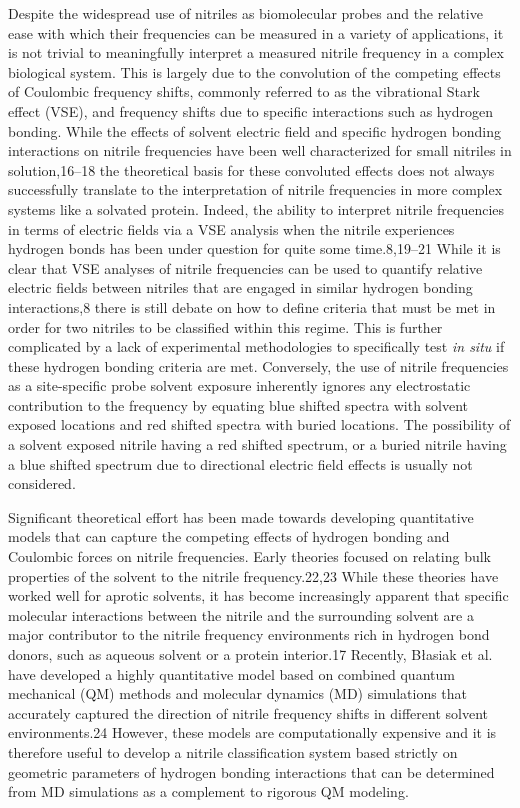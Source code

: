 Despite the widespread use of nitriles as biomolecular probes and the relative ease with which their frequencies can be measured in a variety of applications, it is not trivial to meaningfully interpret a measured nitrile frequency in a complex biological system.
This is largely due to the convolution of the competing effects of Coulombic frequency shifts, commonly referred to as the vibrational Stark effect (VSE), and frequency shifts due to specific interactions such as hydrogen bonding.
While the effects of solvent electric field and specific hydrogen bonding interactions on nitrile frequencies have been well characterized for small nitriles in solution,16–18 the theoretical basis for these convoluted effects does not always successfully translate to the interpretation of nitrile frequencies in more complex systems like a solvated protein.
Indeed, the ability to interpret nitrile frequencies in terms of electric fields via a VSE analysis when the nitrile experiences hydrogen bonds has been under question for quite some time.8,19–21
While it is clear that VSE analyses of nitrile frequencies can be used to quantify relative electric fields between nitriles that are engaged in similar hydrogen bonding interactions,8 there is still debate on how to define criteria that must be met in order for two nitriles to be classified within this regime.
This is further complicated by a lack of experimental methodologies to specifically test \emph{in situ} if these hydrogen bonding criteria are met.
Conversely, the use of nitrile frequencies as a site-specific probe solvent exposure inherently ignores any electrostatic contribution to the frequency by equating blue shifted spectra with solvent exposed locations and red shifted spectra with buried locations.
The possibility of a solvent exposed nitrile having a red shifted spectrum, or a buried nitrile having a blue shifted spectrum due to directional electric field effects is usually not considered.

Significant theoretical effort has been made towards developing quantitative models that can capture the competing effects of hydrogen bonding and Coulombic forces on nitrile frequencies.
Early theories focused on relating bulk properties of the solvent to the nitrile frequency.22,23
While these theories have worked well for aprotic solvents, it has become increasingly apparent that specific molecular interactions between the nitrile and the surrounding solvent are a major contributor to the nitrile frequency environments rich in hydrogen bond donors, such as aqueous solvent or a protein interior.17
Recently, B\l{}asiak et al. have developed a highly quantitative model based on combined quantum mechanical (QM) methods and molecular dynamics (MD) simulations that accurately captured the direction of nitrile frequency shifts in different solvent environments.24
However, these models are computationally expensive and it is therefore useful to develop a nitrile classification system based strictly on geometric parameters of hydrogen bonding interactions that can be determined from MD simulations as a complement to rigorous QM modeling.


